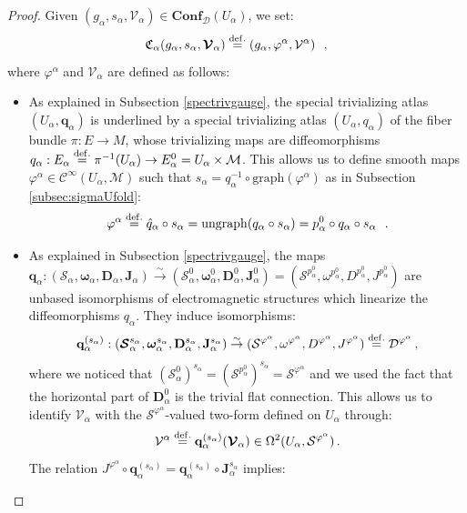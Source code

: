 \documentclass[10pt, cmp, numbook, final, a4paper]{svjour}
\newcommand{\eqdef}{\stackrel{{\rm def.}}{=}}
\def\bD{\mathbb{D}}
\def\bcD{\boldsymbol{\mathcal{D}}}
\def\bJ{\mathbf{J}}
\def\bomega{\boldsymbol{\omega}}
\def\bJ{\mathbf{J}}
\def\graph{\mathrm{graph}}
\def\ungraph{\mathrm{ungraph}}
\newcommand{\be}{\begin{equation*}}
\newcommand{\ee}{\end{equation*}}
\newcommand{\ben}{\begin{equation}}
\newcommand{\een}{\end{equation}}
\def\cC{{\mathcal C}}
\newcommand{\cM}{\mathcal{M}}
\def\cD{\mathcal{D}}
\def\cC{\mathcal{C}}
\def\cS{\mathcal{S}}
\def\cV{\mathcal{V}}
\def\bConf{\mathbf{Conf}}
\def\bD{\mathbf{D}}
\def\bomega{\boldsymbol{\omega}}
\def\bcS{\boldsymbol{\mathcal{S}}}
\def\bD{\mathbf{D}}
\def\mq{\mathbf{q}}
\def\bcV{\boldsymbol{\cV}}
\begin{document}
\begin{proof}
Given $(g_\alpha,s_\alpha,\bcV_\alpha)\in \bConf_{\bcD}(U_\alpha)$, we set:
\begin{equation*}
\mathfrak{C}_{\alpha}(g_{\alpha},s_{\alpha},\bcV_{\alpha})\eqdef (g_{\alpha},\varphi^\alpha,\cV^\alpha)~~,
\end{equation*}
where $\varphi^\alpha$ and $\cV_\alpha$ are defined as follows:
\begin{itemize}
\item As explained in Subsection \ref{spectrivgauge}, the special
  trivializing atlas $(U_\alpha,\mq_\alpha)$ is underlined by a
  special trivializing atlas $(U_\alpha,q_\alpha)$ of the fiber bundle
  $\pi:E\rightarrow M$, whose trivializing maps are diffeomorphisms
  $q_\alpha:E_\alpha\eqdef \pi^{-1}(U_\alpha)\rightarrow
  E_\alpha^0=U_\alpha\times \cM$. This allows us to define smooth maps
  $\varphi^{\alpha}\in \cC^\infty(U_\alpha,\cM)$ such that
  $s_\alpha=q_\alpha^{-1}\circ \graph(\varphi^\alpha)$ as in
  Subsection \ref{subsec:sigmaUfold}:
\begin{equation*}
\varphi^{\alpha}\eqdef \hat{q}_{\alpha}\circ s_{\alpha} = \ungraph(q_\alpha\circ s_\alpha)=p^{0}_{\alpha}\circ q_{\alpha}\circ s_{\alpha}~~.
\end{equation*}
\item As explained in Subsection \ref{spectrivgauge}, the maps
  $\mq_\alpha:(\bcS_\alpha, \bomega_\alpha, \bD_\alpha,
  \bJ_\alpha)\stackrel{\sim}{\rightarrow}
  (\bcS^0_{\alpha},\bomega^0_{\alpha}, \bD^0_{\alpha},
  \bJ^0_{\alpha})=(\cS^{p_\alpha^0}, \omega^{p_\alpha^0},
  D^{p_\alpha^0}, J^{p_\alpha^0})$ are unbased isomorphisms of
  electromagnetic structures which linearize the diffeomorphisms
  $q_\alpha$. They induce isomorphisms:
\be
\mq_\alpha^{(s_\alpha)}:(\bcS_\alpha^{s_\alpha}, \bomega_\alpha^{s_\alpha}, \bD_\alpha^{s_\alpha},
\bJ_\alpha^{s_\alpha})\stackrel{\sim}{\rightarrow}
(\cS^{\varphi^{\alpha}}, \omega^{\varphi^{\alpha}}, D^{\varphi^{\alpha}},
J^{\varphi^{\alpha}})\eqdef \cD^{\varphi^\alpha}\, ,
\ee
where we noticed that
$(\bcS^0_{\alpha})^{s_\alpha}=(\cS^{p^0_{\alpha}})^{s_\alpha}=\cS^{\varphi^\alpha}$ and
we used the fact that the horizontal part of $\bD^0_{\alpha}$ is the
trivial flat connection. This allows us to identify $\bcV_\alpha$ with the
$\cS^{\varphi^{\alpha}}$-valued two-form defined on $U_\alpha$
through:
\ben
\label{cVlocdef}
\cV^{\alpha}\eqdef \mq_\alpha^{(s_\alpha)}(\bcV_\alpha)\in \Omega^2(U_\alpha,\cS^{\varphi^{\alpha}})\, .
\een
The relation $J^{\varphi^{\alpha}}\circ
\mq_\alpha^{(s_\alpha)}=\mq_\alpha^{(s_\alpha)} \circ \bJ_\alpha^{s_\alpha}$ implies:

\end{itemize}
\end{proof}
\end{document}
